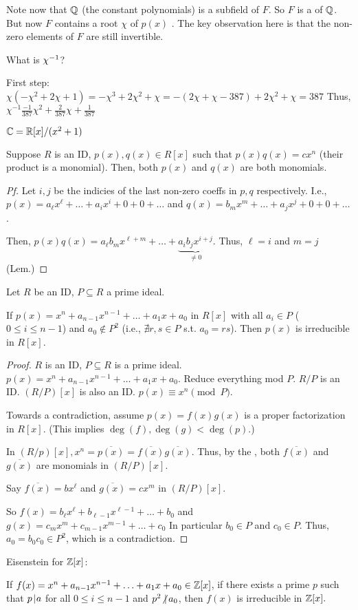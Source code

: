\documentclass[notes.tex]{subfiles}
\begin{document}
Note now that $\mathbb{Q}$ (the constant polynomials) is a subfield of $F$.
So $F$ is a  of $\mathbb{Q}$.
But now $F$ contains a root $\chi$ of $p(x)$ 
.
The key observation here is that the non-zero elements of $F$ are still invertible. 
\begin{eg}
	What is ${\chi}^{-1}$?

	First step: $\chi(-\chi^2 + 2 \chi + 1) = -\chi^3 + 2 \chi^2 + \chi = -(2 \chi + \chi - 387) + 2 \chi^2 + \chi = 387$ 
	Thus, $\chi^{-1} \frac{-1}{387}\chi^2+ \frac{2}{387}\chi + \frac{1}{387}$
\end{eg}
\begin{eg}
	$\mathbb{C} = \mathbb{R}[x]/(x^2 + 1)$
\end{eg}

\begin{lemma}
	\label{wimpylemma}
	Suppose $R$ is an ID, $p(x), q(x)\in R[x]$ such that $p(x)q(x) = cx^n$ (their product is a monomial). Then, both $p(x)$ and $q(x)$ are both monomials. 
\end{lemma}
\begin{proof}[Pf]
	Let $i, j$ be the indicies of the last non-zero coeffs in $p, q$ respectively. I.e.,
	$p(x) = a_{\ell}x^{\ell} + \ldots + a_ix^i + 0 + 0 + \ldots$ and
	$q(x) = b_{m}x^{m} + \ldots + a_jx^j + 0 + 0 + \ldots$.

	Then,
	$p(x)q(x) = a_{\ell}b_mx^{\ell + m} + \ldots + \underbrace{a_ib_jx^{i+j}}_{\ne 0}$. Thus, $\ell = i$ and $m = j$\qedhere(Lem.) 
\end{proof}
\begin{theorem}
\label{eisenstein}
Let $R$ be an ID, $P\subseteq R$ a prime ideal.

If $p(x) = x^n + a_{n-1}x^{n-1} + \ldots + a_1x+a_0$ in $R[x]$ with all $a_i\in P$ ($0\le i \le n-1$) and $a_0\notin P^2$ (i.e., $\nexists r,s\in P$ s.t. $a_0 = rs$). Then $p(x)$ is irreducible in $R[x]$.	
\end{theorem}
\begin{proof}
	$R$ is an ID, $P\subseteq R$ is a prime ideal. $p(x) = x^n + a_{n-1}x^{n-1} + \ldots + a_1x + a_0$. Reduce everything mod $P$. $R/P$ is an ID. $(R/P)[x]$ is also an ID.
	$p(x)\equiv x^n\pmod P$.

	Towards a contradiction, assume $p(x) = f(x)g(x)$ is a proper factorization in $R[x]$. (This implies $\deg(f), \deg(g)<\deg(p)$.)

	In $(R/p)[x], x^n = \overline{p(x)} = \overline{f(x)}\overline{g(x)}$. Thus, by the , both $\overline{f(x)}$ and $\overline{g(x)}$ are monomials in $(R/P)[x]$.

	Say $\overline{f(x)} = bx^{\ell}$ and $\overline{g(x)} = cx^m$ in $(R/P)[x]$.

	So $f(x) = b_{\ell }x^{\ell} + b_{\ell-1}x^{\ell-1} + \ldots + b_0$
	and $g(x) = c_m x^m + c_{m-1}x^{m-1} + \ldots + c_0$
	In particular $b_0\in P$ and $c_0\in P$. Thus, $a_0 = b_0c_0\in P^2$, which is a contradiction.
\end{proof}

\begin{eg}
	Eisenstein for $\mathbb{Z}[x]$:

	If $f(x) = x^n + a_{n-1}x^{n-1} + \ldots + a_1x + a_0\in\mathbb{Z}[x]$,
	if there exists a prime $p$ such that $p\mkern2mu|\mkern1mu a$ for all $0\le i \le n-1$
	and $p^2\mkern1mu{\not{|}}\mkern3mu a_0$, then $f(x)$ is irreducible in $\mathbb{Z}[x].$

\end{eg}
\end{document}
